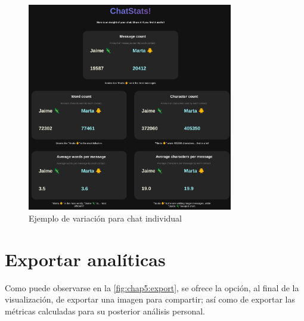 \begin{figure}[h]
	\centering
	\includegraphics[width=0.8\textwidth]{img/study_case/screen_6.png}
	\caption{Ejemplo de variación para chat individual}
	\label{fig:chap5:viz_individual}
\end{figure}

\section{Exportar analíticas}

Como puede observarse en la \autoref{fig:chap5:export}, se ofrece la opción, al final de la visualización, de exportar una imagen para compartir; así como de exportar las métricas calculadas para su posterior análisis personal.

